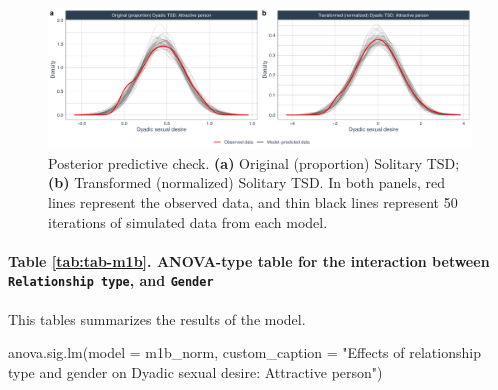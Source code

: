 \documentclass[
  bookmarksnumbered]{article}
\newenvironment{Shaded}{\begin{snugshade}}{\end{snugshade}}
\newcommand{\AttributeTok}[1]{\textcolor[rgb]{0.80,0.80,0.80}{#1}}
\newcommand{\FunctionTok}[1]{\textcolor[rgb]{0.94,0.94,0.56}{#1}}
\newcommand{\NormalTok}[1]{\textcolor[rgb]{0.80,0.80,0.80}{#1}}
\newcommand{\StringTok}[1]{\textcolor[rgb]{0.80,0.58,0.58}{#1}}
\begin{document}
\begin{figure}
\centering
\includegraphics{Sexual_Desire_Arousal_V2_files/figure-latex/ppc-m1b-1.pdf}
\caption{\label{fig:ppc-m1b}Posterior predictive check. \textbf{(a)} Original (proportion) Solitary TSD; \textbf{(b)} Transformed (normalized) Solitary TSD. In both panels, red lines represent the observed data, and thin black lines represent 50 iterations of simulated data from each model.}
\end{figure}

\paragraph{\texorpdfstring{Table \ref{tab:tab-m1b}. ANOVA-type table for the interaction between \texttt{Relationship\ type}, and \texttt{Gender}}{Table \ref{tab:tab-m1b}. ANOVA-type table for the interaction between Relationship type, and Gender}}\label{table-reftabtab-m1b.-anova-type-table-for-the-interaction-between-relationship-type-and-gender}

This tables summarizes the results of the model.

\begin{Shaded}
\begin{Highlighting}[]
\FunctionTok{anova.sig.lm}\NormalTok{(}\AttributeTok{model =}\NormalTok{ m1b\_norm, }\AttributeTok{custom\_caption =} \StringTok{"Effects of relationship type and gender on }
\StringTok{          Dyadic sexual desire: Attractive person"}\NormalTok{)}
\end{Highlighting}
\end{Shaded}
\end{document}
